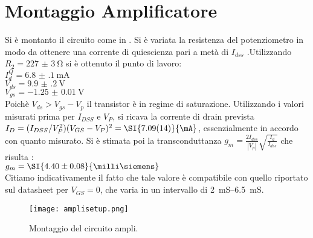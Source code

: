 \section{Montaggio Amplificatore}
Si è montanto il circuito come in . Si è variata la resistenza del potenziometro in modo da ottenere una corrente di quiescienza pari a metà di $I_{dss}$ .Utilizzando $R_2 =\SI{227(3)}{\ohm} $ si è ottenuto il punto di lavoro: \\
$I_{d}^{Q}=\SI{6.8(1)}{\mA}$ \\
$V_{ds}=\SI{9.9(2)}{\V}$\\
$V_{gs}=\SI{-1.25(1)}{\V}$\\
Poichè $V_{ds} > V_{gs}-V_p $ il transistor è in regime di saturazione. Utilizzando i valori misurati prima per $I_{DSS}$ e $V_P$, si ricava la corrente di drain prevista $I_D = (I_{DSS}/V_P^2)(V_{GS} - V_P)^2 = \SI{7.09 (14)}{\mA} $, essenzialmente in accordo con quanto misurato.
Si è stimata poi la transconduttanza $g_m= \frac{2I_{dss}}{\left | V_p \right |}\sqrt{\frac{I_d}{I_{dss}}} $ che risulta :\\
$g_m = \SI{4.40 \pm 0.08}{\milli\siemens}$\\
Citiamo indicativamente il fatto che tale valore è compatibile con quello riportato sul datasheet per $V_{GS}=0$, che varia in un intervallo di \SIrange{2}{6.5}{\milli\siemens}. 
\begin{figure}[h]
	\centering
	\texttt{[image: amplisetup.png]}
	\caption{Montaggio del circuito ampli.}
	\label{f:setup_ampli}
\end{figure}
